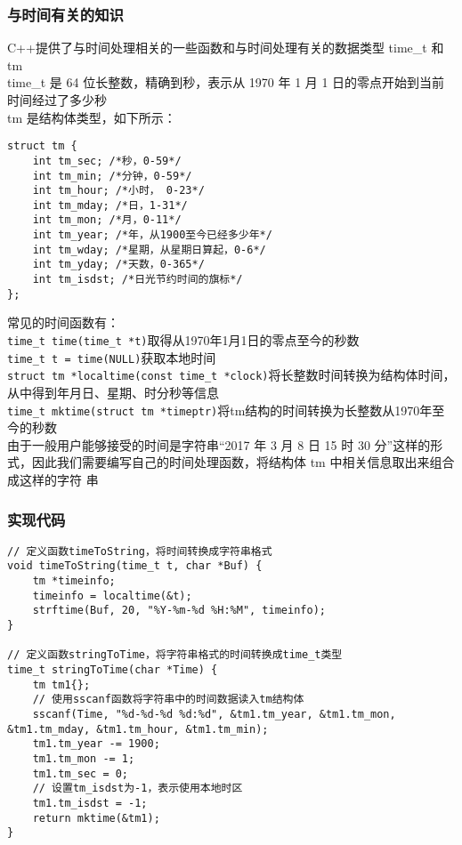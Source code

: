 \documentclass[UTF8]{ctexart}
\begin{document}
	\subsubsection{与时间有关的知识}
	\qquad C++提供了与时间处理相关的一些函数和与时间处理有关的数据类型 time\_t 和 tm \\
	\qquad time\_t 是 64 位长整数，精确到秒，表示从 1970 年 1 月 1 日的零点开始到当前时间经过了多少秒 \\
	\qquad tm 是结构体类型，如下所示：
	\begin{lstlisting}
struct tm {
	int tm_sec; /*秒，0-59*/
	int tm_min; /*分钟，0-59*/
	int tm_hour; /*小时， 0-23*/
	int tm_mday; /*日，1-31*/
	int tm_mon; /*月，0-11*/ 
	int tm_year; /*年，从1900至今已经多少年*/
	int tm_wday; /*星期，从星期日算起，0-6*/
	int tm_yday; /*天数，0-365*/
	int tm_isdst; /*日光节约时间的旗标*/
};
	\end{lstlisting}
	\qquad 常见的时间函数有：\\
	\qquad \lstinline{time_t time(time_t *t)}\quad 取得从1970年1月1日的零点至今的秒数 \\
	\qquad \lstinline{time_t t = time(NULL)}\quad 获取本地时间 \\
	\qquad \lstinline{struct tm *localtime(const time_t *clock)}\quad 将长整数时间转换为结构体时间，从中得到年月日、星期、时分秒等信息 \\
	\qquad \lstinline{time_t mktime(struct tm *timeptr)}\quad 将tm结构的时间转换为长整数从1970年至今的秒数 \\
	\qquad 由于一般用户能够接受的时间是字符串“2017 年 3 月 8 日 15 时 30 分”这样的形式，因此我们需要编写自己的时间处理函数，将结构体 tm 中相关信息取出来组合成这样的字符
串 \\
	
	\subsubsection{实现代码}
	\begin{lstlisting}
// 定义函数timeToString，将时间转换成字符串格式
void timeToString(time_t t, char *Buf) {
    tm *timeinfo;
    timeinfo = localtime(&t);
    strftime(Buf, 20, "%Y-%m-%d %H:%M", timeinfo);
}

// 定义函数stringToTime，将字符串格式的时间转换成time_t类型
time_t stringToTime(char *Time) {
    tm tm1{};
    // 使用sscanf函数将字符串中的时间数据读入tm结构体
    sscanf(Time, "%d-%d-%d %d:%d", &tm1.tm_year, &tm1.tm_mon, &tm1.tm_mday, &tm1.tm_hour, &tm1.tm_min);
    tm1.tm_year -= 1900;
    tm1.tm_mon -= 1;
    tm1.tm_sec = 0;
    // 设置tm_isdst为-1，表示使用本地时区
    tm1.tm_isdst = -1;
    return mktime(&tm1);
}
	\end{lstlisting}
	
\end{document}
